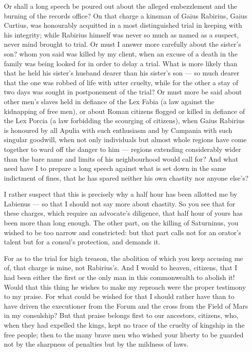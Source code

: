  Or shall a long speech be poured out about the alleged embezzlement and the burning of the records office? On that charge a kinsman of Gaius Rabirius, Gaius Curtius, was honourably acquitted in a most distinguished trial in keeping with his integrity; while Rabirius himself was never so much as named as a suspect, never mind brought to trial. Or must I answer more carefully about the sister's son? whom you said was killed by my client, when an excuse of a death in the family was being looked for in order to delay a trial. What is more likely than that he held his sister's husband dearer than his sister's son --- so much dearer that the one was robbed of life with utter cruelty, while for the other a stay of two days was sought in postponement of the trial? Or must more be said about other men's slaves held in defiance of the Lex Fabia (a law against the kidnapping of free men), or about Roman citizens flogged or killed in defiance of the Lex Porcia (a law forbidding the scourging of citizens), when Gaius Rabirius is honoured by all Apulia with such enthusiasm and by Campania with such singular goodwill, when not only individuals but almost whole regions have come together to ward off the danger to him --- regions extending considerably wider than the bare name and limits of his neighbourhood would call for? And what need have I to prepare a long speech against what is set down in the same indictment of fines, that he has spared neither his own chastity nor anyone else's?

 I rather suspect that this is precisely why a half hour has been allotted me by Labienus --- so that I should not say more about chastity. So you see that for these charges, which require an advocate's diligence, that half hour of yours has been more than long enough. The other part, on the killing of Saturninus, you wished to be too narrow and constricted: but that part calls not for an orator's talent but for a consul's protection, and demands it.

 For as to the trial for high treason, the abolition of which you keep accusing me of, that charge is mine, not Rabirius's. And I would to heaven, citizens, that I had been either the first or the only man in this commonwealth to abolish it! Would that this thing he wishes to make my reproach were the proper testimony to my praise. For what could be wished for that I should rather have than to have driven the executioner from the Forum and the cross from the Field of Mars in my consulship? But that praise belongs first to our ancestors, citizens, who, when they had expelled the kings, kept no trace of the cruelty of kingship in the free people; then to the many brave men who wished your liberty to be guarded not by the sharpness of penalties but by the mildness of laws.

